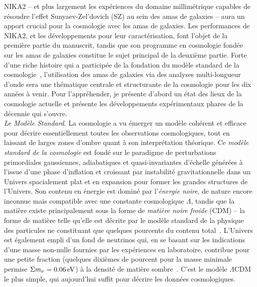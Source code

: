 

NIKA2 -- et plus largement les expériences du domaine
millimétrique capables de résoudre l'effet Sunyaev-Zel'dovich (SZ) au
sein des amas de galaxies -- aura un apport crucial pour la cosmologie
avec les amas de galaxies. Les performances de NIKA2, et les
développements pour leur caractérisation, font l'objet de la première
partie du manuscrit, tandis que son programme en cosmologie fondée sur
les amas de galaxies constitue le sujet principal de la deuxième
partie. Forte d'une riche histoire qui a
participée de la fondation du modèle standard de la
cosmologie~\citep[voir \emph{e.g.}][pour une revue]{Allen2011},
l'utilisation des amas de galaxies via des analyses multi-longueur
d'onde sera une thématique centrale et structurante de la cosmologie pour les dix
années à venir. Pour l'appréhender, je présente d'abord un état des
lieux de la cosmologie actuelle et présente les développements
expérimentaux phares de la décennie qui s'ouvre.\\



\emph{Le Modèle Standard.} La cosmologie a vu émerger un modèle
cohérent et efficace pour décrire essentiellement toutes les
observations cosmologiques, tout en laissant de larges zones d'ombre
quant à son interprétation théorique. Ce \emph{modèle
standard de la cosmologie} est fondé sur le paradigme de perturbations
primordiales gaussiennes, adiabatiques et quasi-invariantes d'échelle
générées à l'issue d'une phase d'inflation et croissant par
instabilité gravitationnelle dans un Univers spacialement plat et en
expansion pour former les grandes structures de l'Univers. Son contenu
en énergie est dominé par l'\emph{énergie noire}, de nature encore
inconnue mais compatible avec une constante cosmologique $\Lambda$, tandis
que la matière existe principalement sous la forme de
\emph{matière noire froide} (CDM) -- la forme de matière telle qu'elle
est décrite par le modèle standard de la physique des particules ne
constituant que quelques pourcents du contenu
total~\citep[pour des mesures récentes,
voir \emph{e.g}][]{Planck_2018_cosmo, BOSS2017, eBOSS2019,
DES2018_cosmo, DES2019_cosmo, SNLS2014, PANSTARR2018}. L'Univers est également empli d'un fond de
neutrinos qui, en se basant sur les indications d'une
masse non-nulle fournies par les expériences en laboratoire,
contribue pour une petite fraction (quelques dixièmes de pourcent pour
la masse minimale permise $\Sigma m_\nu = 0.06\,\rm{eV}$) à
la densité de matière sombre~\citep[voir pour une
revue][]{Lesgourgues2006, Lesgourgues_Book}. C'est le modèle
$\Lambda$CDM le plus simple, qui aujourd'hui suffit pour décrire les
données cosmologiques.\\

